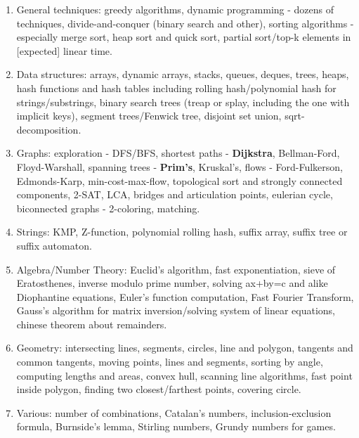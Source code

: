 \documentclass[11pt]{article}
\begin{document}

\begin{enumerate}
\item{General techniques: greedy algorithms, dynamic programming - dozens of techniques, divide-and-conquer (binary search and other), sorting algorithms - especially merge sort, heap sort and quick sort, partial sort/top-k elements in [expected] linear time.}

\item{Data structures: arrays, dynamic arrays, stacks, queues, deques, trees, heaps, hash functions and hash tables including rolling hash/polynomial hash for strings/substrings, binary search trees (treap or splay, including the one with implicit keys), segment trees/Fenwick tree, disjoint set union, sqrt-decomposition.}

\item{Graphs: exploration - DFS/BFS, shortest paths - {\bf Dijkstra}, Bellman-Ford, Floyd-Warshall, spanning trees - {\bf Prim’s}, Kruskal’s, flows - Ford-Fulkerson, Edmonds-Karp, min-cost-max-flow, topological sort and strongly connected components, 2-SAT, LCA, bridges and articulation points, eulerian cycle, biconnected graphs - 2-coloring, matching.}

\item{Strings: KMP, Z-function, polynomial rolling hash, suffix array, suffix tree or suffix automaton.}

\item{Algebra/Number Theory: Euclid’s algorithm, fast exponentiation, sieve of Eratosthenes, inverse modulo prime number, solving ax+by=c and alike Diophantine equations, Euler’s function computation, Fast Fourier Transform, Gauss’s algorithm for matrix inversion/solving system of linear equations, chinese theorem about remainders.}

\item{Geometry: intersecting lines, segments, circles, line and polygon, tangents and common tangents, moving points, lines and segments, sorting by angle, computing lengths and areas, convex hull, scanning line algorithms, fast point inside polygon, finding two closest/farthest points, covering circle.}

\item{Various: number of combinations, Catalan’s numbers, inclusion-exclusion formula, Burnside’s lemma, Stirling numbers, Grundy numbers for games.}
\end{enumerate}
\end{document}
